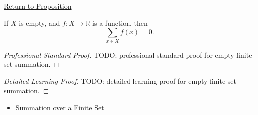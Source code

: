 \newpage
{}
\label{prf:empty-finite-set-summation}

\begin{remark*}[Return]
\hyperref[prop:empty-finite-set-summation]{Return to Proposition}
\end{remark*}

\begin{proposition*}
If \(X\) is empty, and \(f:X\to\mathbb{R}\) is a function, then
\[
  \sum_{x\in X} f(x)=0.
\]
\end{proposition*}

\begin{proof}[Professional Standard Proof]
\LRAProofBodyStart
TODO: professional standard proof for empty-finite-set-summation.
\end{proof}

\begin{proof}[Detailed Learning Proof]
\LRAProofBodyStart
TODO: detailed learning proof for empty-finite-set-summation.
\end{proof}

\begin{remark*}
\end{remark*}

\begin{dependencies}
\begin{itemize}
  \item \hyperref[def:summation-over-finite-set]{Summation over a Finite Set}
\end{itemize}
\end{dependencies}

\clearpage
